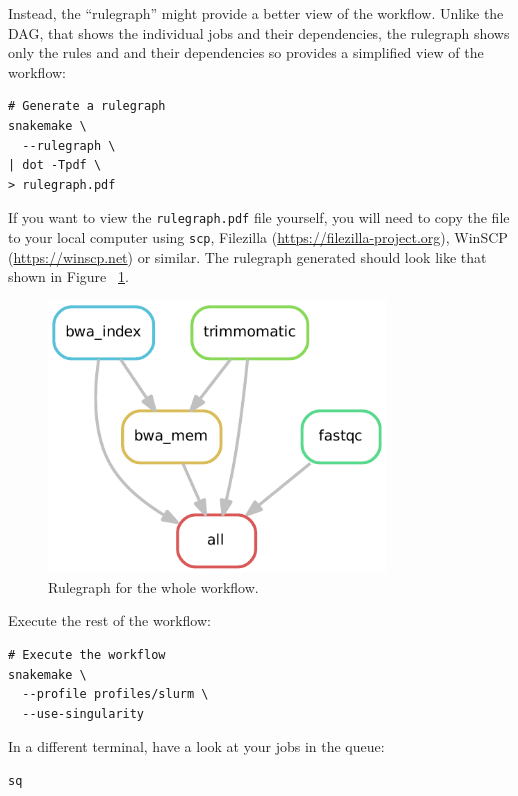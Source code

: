 Instead, the ``rulegraph'' might provide a better view of the workflow.
Unlike the DAG, that shows the individual jobs and their dependencies, the rulegraph shows only the rules and and their dependencies so provides a simplified view of the workflow:

\begin{lstlisting}
# Generate a rulegraph
snakemake \
  --rulegraph \
| dot -Tpdf \
> rulegraph.pdf
\end{lstlisting}

\begin{warning}

If you want to view the \texttt{rulegraph.pdf} file yourself, you will need to copy the file to your local computer using \texttt{scp}, Filezilla (\url{https://filezilla-project.org}), WinSCP (\url{https://winscp.net}) or similar.
The rulegraph generated should look like that shown in Figure ~\ref{fig:rulegraph}.

\end{warning}

\begin{figure}[H]
\centering
\includegraphics[width=0.8\textwidth]{handout/rulegraph.pdf}
\caption{Rulegraph for the whole workflow.}
\label{fig:rulegraph}
\end{figure}

Execute the rest of the workflow:

\begin{lstlisting}
# Execute the workflow
snakemake \
  --profile profiles/slurm \
  --use-singularity
\end{lstlisting}

In a different terminal, have a look at your jobs in the queue:

\begin{lstlisting}
sq
\end{lstlisting}

